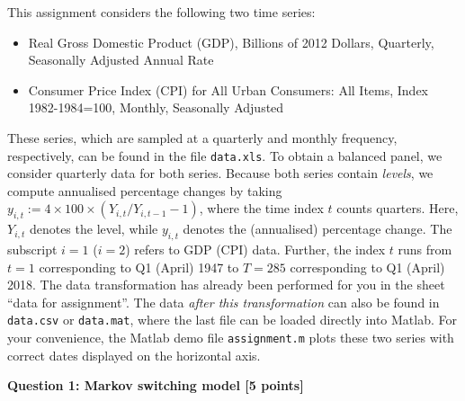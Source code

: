 \documentclass[12pt, a4paper]{article}
\begin{document}
\bigskip \noindent This assignment considers the following two time series:
\begin{itemize}
\item Real Gross Domestic Product (GDP), Billions of 2012 Dollars, Quarterly, Seasonally Adjusted Annual Rate
\item Consumer Price Index (CPI) for All Urban Consumers: All Items, Index 1982-1984=100, Monthly, Seasonally Adjusted
\end{itemize}
These series, which are sampled at a quarterly and monthly frequency, respectively, can be found in the file \texttt{data.xls}. To obtain a balanced panel, we consider quarterly data for both series. Because both series contain \emph{levels}, we compute  annualised percentage changes by taking $y_{i,t}:=4\times 100\times(Y_{i,t}/Y_{i,t-1}-1)$, where the time index $t$ counts quarters. Here, $Y_{i,t}$ denotes the level, while $y_{i,t}$ denotes the (annualised) percentage change. The subscript $i=1$ ($i=2$) refers to  GDP (CPI) data. Further, the index $t$ runs from $t=1$ corresponding to Q1 (April) 1947 to $T=285$ corresponding to Q1 (April) 2018.  The data transformation has already been performed for you in the sheet ``data for assignment''. The data \emph{after this transformation} can also be found in  \texttt{data.csv} or \texttt{data.mat}, where the last file can be loaded directly into Matlab. For your convenience, the Matlab demo file \texttt{assignment.m} plots these two series with correct dates displayed on the horizontal axis.

\bigskip

\noindent \textbf{Question 1: Markov switching model [5 points]}
\end{document}

